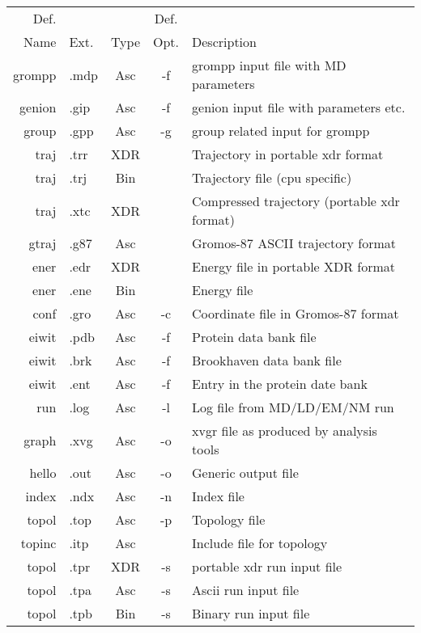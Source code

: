 \begin{table}[p]
\begin{tabularx}{\linewidth}{rlccX}
\hline
    Def. &       &      &  Def. & \\
    Name &  Ext. & Type &  Opt. & Description \\
\hline
  grompp &  .mdp & Asc &    -f & grompp input file with MD parameters \\
  genion &  .gip & Asc &    -f & genion input file with parameters etc. \\
   group &  .gpp & Asc &    -g & group related input for grompp \\
    traj &  .trr & XDR &       & Trajectory in portable xdr format \\
    traj &  .trj & Bin &       & Trajectory file (cpu specific) \\
    traj &  .xtc & XDR &       & Compressed trajectory (portable xdr format) \\
   gtraj &  .g87 & Asc &       & Gromos-87 ASCII trajectory format \\
    ener &  .edr & XDR &       & Energy file in portable XDR format \\
    ener &  .ene & Bin &       & Energy file \\
    conf &  .gro & Asc &    -c & Coordinate file in Gromos-87 format \\
   eiwit &  .pdb & Asc &    -f & Protein data bank file \\
   eiwit &  .brk & Asc &    -f & Brookhaven data bank file \\
   eiwit &  .ent & Asc &    -f & Entry in the protein date bank \\
     run &  .log & Asc &    -l & Log file from MD/LD/EM/NM run \\
   graph &  .xvg & Asc &    -o & xvgr file as produced by analysis tools \\
   hello &  .out & Asc &    -o & Generic output file \\
   index &  .ndx & Asc &    -n & Index file \\
   topol &  .top & Asc &    -p & Topology file \\
  topinc &  .itp & Asc &       & Include file for topology \\
   topol &  .tpr & XDR &    -s & portable xdr run input file \\
   topol &  .tpa & Asc &    -s & Ascii run input file \\
   topol &  .tpb & Bin &    -s & Binary run input file \\

\end{tabularx}
\end{table}
